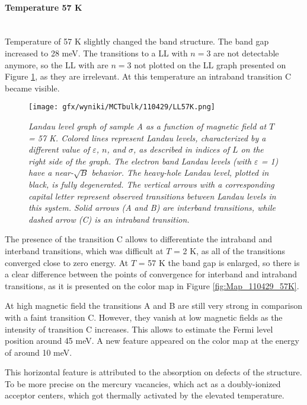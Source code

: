 \documentclass[titlepage,a4paper]{book}
\newcommand{\wciecie}{\quad\phantom{v}}
\newcommand{\myparagraph}[1]{\paragraph{#1}\mbox{}\\}
\begin{document}
\clearpage
\myparagraph{Temperature 57 K}
\wciecie
Temperature of 57 K slightly changed the band structure. The band gap increased to 28 meV. The transitions to a LL with $n = 3$ are not detectable anymore, so the LL with are $n = 3$ not plotted on the LL graph presented on Figure \ref{fig:LL_110429_57K}, as they are irrelevant. At this temperature an intraband transition C became visible.

\begin{figure}[ht]
	\centering
	\texttt{[image: gfx/wyniki/MCTbulk/110429/LL57K.png]}
	\vspace{-10pt}
	\caption{\textit{Landau level graph of sample A as a function of magnetic field at $T$ = 57 K. Colored lines represent Landau levels, characterized by a different value of $\varepsilon$, $n$, and $\sigma$, as described in indices of $L$ on the right side of the graph. The electron band Landau levels (with $\varepsilon$ = 1) have a near-$\sqrt{B}$ behavior. The heavy-hole Landau level, plotted in black, is fully degenerated. The vertical arrows with a corresponding capital letter represent observed transitions between Landau levels in this system. Solid arrows (A and B) are interband transitions, while dashed arrow (C) is an intraband transition.}} 
	\label{fig:LL_110429_57K}
\end{figure}

The presence of the transition C allows to differentiate the intraband and interband transitions, which was difficult at $T$ = 2 K, as all of the transitions converged close to zero energy. At $T$ = 57 K the band gap is enlarged, so there is a clear difference between the points of convergence for interband and intraband transitions, as it is presented on the color map in Figure \ref{fig:Map_110429_57K}.
 
At high magnetic field the transitions A and B are still very strong in comparison with a faint transition C. However, they vanish at low magnetic fields as the intensity of transition C increases. This allows to estimate the Fermi level position around 45 meV. A new feature appeared on the color map at the energy of around 10 meV. 

This horizontal feature is attributed to the absorption on defects of the structure. To be more precise on the mercury vacancies, which act as a doubly-ionized acceptor centers, which got thermally activated by the elevated temperature.
\end{document}
